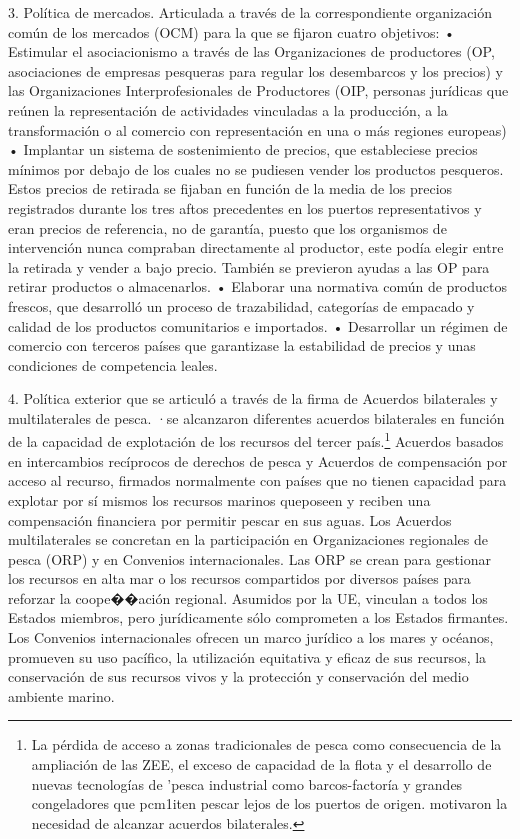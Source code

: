 \documentclass[10pt,a4paper]{article}
\begin{document}
3. Política de mercados. Articulada a través de la correspondiente organización común de los mercados (OCM) para la que se fijaron cuatro objetivos:
• Estimular el asociacionismo a través de las Organizaciones de productores (OP, asociaciones de empresas pesqueras para regular los desembarcos y los precios) y las Organizaciones Interprofesionales de Productores (OIP, personas jurídicas que reúnen la representación de actividades vinculadas a la producción, a la transformación o al comercio con representación en una o más regiones europeas)
• Implantar un sistema de sostenimiento de precios, que estableciese precios mínimos por debajo de los cuales no se pudiesen vender los productos pesqueros. Estos precios de retirada se fijaban en función de la media de los precios registrados durante los tres aftos precedentes en los puertos representativos y eran precios de referencia, no de garantía, puesto que los organismos de intervención nunca compraban directamente al productor, este podía elegir entre la retirada y vender a bajo precio. También se previeron ayudas a las OP para retirar productos o almacenarlos.
• Elaborar una normativa común de productos frescos, que desarrolló un proceso de trazabilidad, categorías de empacado y calidad de los productos comunitarios e importados.
• Desarrollar un régimen de comercio con terceros países que garantizase la estabilidad de precios y unas condiciones de competencia leales.

4. Política exterior que se articuló a través de la firma de Acuerdos bilaterales y multilaterales de pesca. ·se alcanzaron diferentes acuerdos bilaterales en función de la capacidad de explotación de los recursos del tercer país.\footnote{%
    La pérdida de acceso a zonas tradicionales de pesca como consecuencia de la ampliación de las ZEE, el exceso de capacidad de la flota y el desarrollo de nuevas tecnologías de 'pesca industrial como barcos-factoría y grandes congeladores que pcm1iten pescar lejos de los puertos de origen. motivaron la necesidad de alcanzar acuerdos bilaterales.
} Acuerdos basados en intercambios recíprocos de derechos de pesca y Acuerdos de compensación por acceso al recurso, firmados normalmente con países que no tienen capacidad para explotar por sí mismos los recursos marinos queposeen y reciben una compensación financiera por permitir pescar en sus aguas. Los Acuerdos multilaterales se concretan en la participación en Organizaciones regionales de pesca (ORP) y en Convenios internacionales. Las ORP se crean para gestionar los recursos en alta mar o los recursos compartidos por diversos países para reforzar la coope��ación regional. Asumidos por la UE, vinculan a todos los Estados miembros, pero jurídicamente sólo comprometen a los Estados firmantes. Los Convenios internacionales ofrecen un marco jurídico a los mares  y océanos, promueven su uso pacífico, la utilización equitativa y eficaz de sus recursos, la conservación de sus recursos vivos y la protección y conservación del medio ambiente marino.
\end{document}
